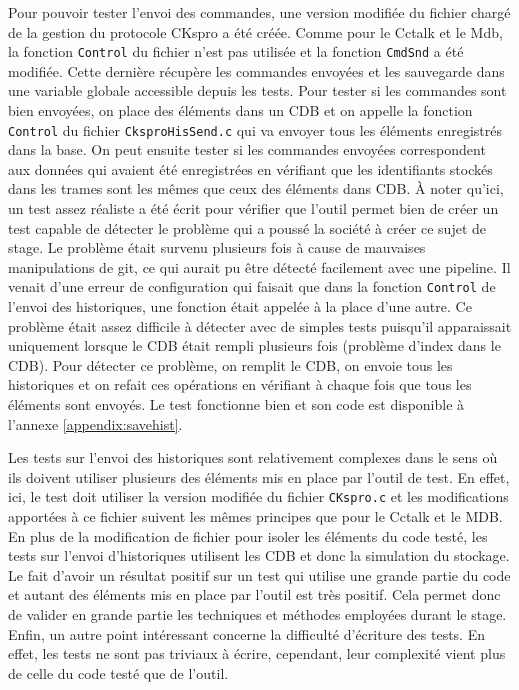 \documentclass[a4paper]{article}
\begin{document}
Pour pouvoir tester l'envoi des commandes, une version modifiée du fichier
chargé de la gestion du protocole CKspro a été créée. Comme pour le Cctalk et le
Mdb, la fonction \verb|Control| du fichier n'est pas utilisée et la fonction
\verb|CmdSnd| a été modifiée. Cette dernière récupère les commandes envoyées et
les sauvegarde dans une variable globale accessible depuis les tests. Pour
tester si les commandes sont bien envoyées, on place des éléments dans un CDB et
on appelle la fonction \verb|Control| du fichier \verb|CksproHisSend.c| qui va
envoyer tous les éléments enregistrés dans la base. On peut ensuite tester si
les commandes envoyées correspondent aux données qui avaient été enregistrées en
vérifiant que les identifiants stockés dans les trames sont les mêmes que ceux
des éléments dans CDB. À noter qu'ici, un test assez réaliste a été écrit pour
vérifier que l'outil permet bien de créer un test capable de détecter le
problème qui a poussé la société à créer ce sujet de stage. Le problème était
survenu plusieurs fois à cause de mauvaises manipulations de git, ce qui aurait
pu être détecté facilement avec une pipeline. Il venait d'une erreur de
configuration qui faisait que dans la fonction \verb|Control| de l'envoi des
historiques, une fonction était appelée à la place d'une autre. Ce problème
était assez difficile à détecter avec de simples tests puisqu'il apparaissait
uniquement lorsque le CDB était rempli plusieurs fois (problème d'index dans le
CDB). Pour détecter ce problème, on remplit le CDB, on envoie tous les
historiques et on refait ces opérations en vérifiant à chaque fois que tous les
éléments sont envoyés. Le test fonctionne bien et son code est disponible à
l'annexe \ref{appendix:savehist}.

Les tests sur l'envoi des historiques sont relativement complexes dans le sens
où ils doivent utiliser plusieurs des éléments mis en place par l'outil de test.
En effet, ici, le test doit utiliser la version modifiée du fichier
\verb|CKspro.c| et les modifications apportées à ce fichier suivent les mêmes
principes que pour le Cctalk et le MDB. En plus de la modification de fichier
pour isoler les éléments du code testé, les tests sur l'envoi d'historiques
utilisent les CDB et donc la simulation du stockage. Le fait d'avoir un résultat
positif sur un test qui utilise une grande partie du code et autant des éléments
mis en place par l'outil est très positif. Cela permet donc de valider en grande
partie les techniques et méthodes employées durant le stage. Enfin, un autre
point intéressant concerne la difficulté d'écriture des tests. En effet, les
tests ne sont pas triviaux à écrire, cependant, leur complexité vient plus de
celle du code testé que de l'outil.
\end{document}
